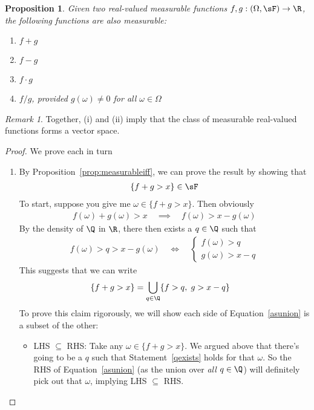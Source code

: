 \documentclass[12pt]{article}
\theoremstyle{plain}
\newtheorem{prop}[thm]{Proposition}
\theoremstyle{definition}
\theoremstyle{remark}
\newtheorem*{rmk}{Remark}
\newcommand{\ra}{\rightarrow}
\begin{document}
\begin{prop}
Given two real-valued measurable functions $f,g:(\Omega,\sF)\ra\R$,
the following functions are also measurable:
\begin{enumerate}[label=\emph{(\roman*)}]
  \item $f+g$
  \item $f-g$
  \item $f\cdot g$
  \item $f/g$, provided $g(\omega)\neq 0$ for all $\omega\in\Omega$
\end{enumerate}
\end{prop}
\begin{rmk}
Together, (i) and (ii) imply that the class of measurable real-valued
functions forms a vector space.
\end{rmk}
\begin{proof}
We prove each in turn
\begin{enumerate}[label=(\roman*)]
  \item
    By Proposition~\ref{prop:measurableiff}, we can prove the result by
    showing that
    \begin{align*}
      \{f+g> x\} \in\sF
    \end{align*}
    To start, suppose you give me $\omega\in \{f+g>x\}$. Then obviously
    \begin{align*}
      f(\omega) + g(\omega) > x
      \quad\implies\quad
      f(\omega) > x  - g(\omega)
    \end{align*}
    By the density of $\Q$ in $\R$, there then exists a $q\in \Q$ such
    that
    \begin{align}
      f(\omega) > q > x  - g(\omega)
      \quad\iff\quad
      \begin{cases}
        f(\omega) > q \\
        g(\omega) > x  - q
      \end{cases}
      \label{qexists}
    \end{align}
    This suggests that we can write
    \begin{align}
      \{f+g> x\}
      &=
      \bigcup_{q\in \Q}
      \{
        f > q,\;
        g > x-q
      \}
      \label{asunion}
    \end{align}
    To prove this claim rigorously, we will show each side of
    Equation~\ref{asunion} is a subset of the other:
    \begin{itemize}
      \item LHS $\subseteq$ RHS:
        Take any $\omega\in \{f+g>x\}$.  We argued above that there's
        going to be a $q$ such that Statement~\ref{qexists} holds for
        that $\omega$. So the RHS of Equation~\ref{asunion} (as the
        union over \emph{all} $q\in\Q$) will definitely pick out that
        $\omega$, implying LHS $\subseteq$ RHS.


\end{itemize}
\end{enumerate}
\end{proof}
\end{document}
